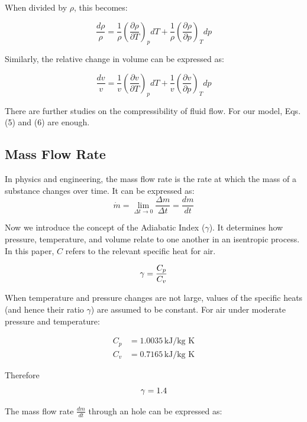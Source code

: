 When divided by $\rho$, this becomes:

\begin{equation}
\frac{d\rho}{\rho} = \frac{1}{\rho} \left( \frac{\partial \rho}{\partial T} \right)_p dT + \frac{1}{\rho} \left( \frac{\partial \rho}{\partial p} \right)_T dp
\end{equation}

Similarly, the relative change in volume can be expressed as:

\begin{equation}
\frac{dv}{v} = \frac{1}{v} \left( \frac{\partial v}{\partial T} \right)_p dT + \frac{1}{v} \left( \frac{\partial v}{\partial p} \right)_T dp
\end{equation}

There are further studies on the compressibility of fluid flow. For our model, Eqs. (5) and (6) are enough.

\subsection{Mass Flow Rate}
In physics and engineering, the mass flow rate is the rate at which the mass of a substance changes over time. It can be expressed as:
\[
\dot{m} = \lim_{\Delta t \to 0} \frac{\Delta m}{\Delta t} = \frac{dm}{dt}
\]

Now we introduce the concept of the Adiabatic Index ($\gamma$). It determines how pressure, temperature, and volume relate to one another in an isentropic process. In this paper, $C$ refers to the relevant specific heat for air.

\begin{equation}
    \gamma=\frac{C_p}{C_v}\notag
\end{equation}

When temperature and pressure changes are not large, values of the specific heats (and hence their ratio $\gamma$) are assumed to be constant. For air under moderate pressure and temperature:\cite{saad-1985}

\begin{align*}
C_p &= 1.0035 \, \text{kJ/kg K} \\
C_v &= 0.7165 \, \text{kJ/kg K} 
\end{align*}

Therefore 
\begin{equation}
    \gamma = 1.4
    \notag
\end{equation}

The mass flow rate $\frac{dm}{dt}$ through an hole can be expressed as:

